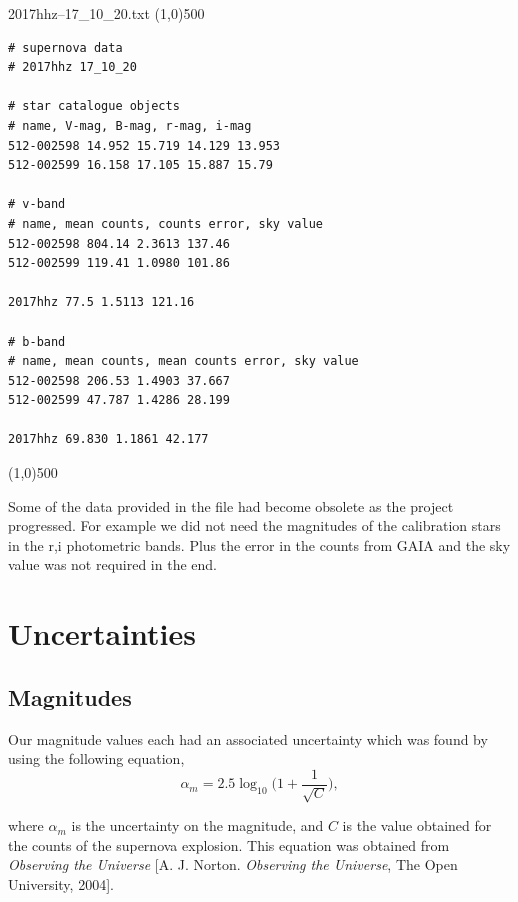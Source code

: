 \documentclass[twocolumn]{revtex4}
\begin{document}
{{{{{{\begin{center}
2017hhz--17\_10\_20.txt
\line(1,0){500}
\vspace{-4ex}
\end{center}
\begin{lstlisting}
# supernova data
# 2017hhz 17_10_20

# star catalogue objects
# name, V-mag, B-mag, r-mag, i-mag
512-002598 14.952 15.719 14.129 13.953
512-002599 16.158 17.105 15.887 15.79

# v-band
# name, mean counts, counts error, sky value
512-002598 804.14 2.3613 137.46
512-002599 119.41 1.0980 101.86

2017hhz 77.5 1.5113 121.16

# b-band
# name, mean counts, mean counts error, sky value
512-002598 206.53 1.4903 37.667
512-002599 47.787 1.4286 28.199

2017hhz 69.830 1.1861 42.177
\end{lstlisting}
\begin{center}
\vspace{-7ex}
\line(1,0){500}
\end{center}

Some of the data provided in the file had become obsolete as the project progressed. For example we did not need the magnitudes of the calibration stars in the r,i photometric bands. Plus the error in the counts from GAIA and the sky value was not required in the end. 

\clearpage

\twocolumngrid
\vspace{-3ex}
\section{Uncertainties} \label{app:uncertainties}
\vspace{-2ex}
\subsection{Magnitudes}
\vspace{-2ex}
Our magnitude values each had an associated uncertainty which was found by using the following equation,
\begin{equation}
\alpha_{m} = 2.5 \log_{10} \Big(1 + \frac{1}{\sqrt{C}} \Big),
\label{eqn:mag_uncert}
\end{equation}

where $\alpha_{m}$ is the uncertainty on the magnitude, and $C$ is the value obtained for the counts of the supernova explosion. This equation was obtained from \textit{Observing the Universe} [A. J. Norton. \textit{Observing the Universe}, The Open University, 2004].

}}}}}}
\end{document}

